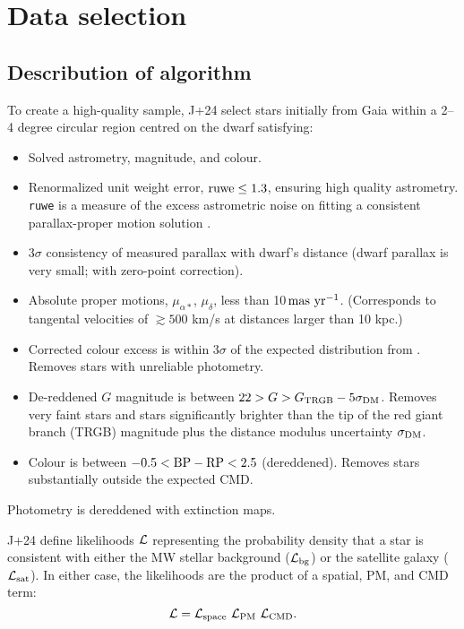 \chapter{Data selection}\label{data-selection}

\section{Describution of algorithm}\label{describution-of-algorithm}

To create a high-quality sample, J+24 select stars initially from Gaia
within a 2--4 degree circular region centred on the dwarf satisfying:

\begin{itemize}
\tightlist
\item
  Solved astrometry, magnitude, and colour.
\item
  Renormalized unit weight error, \({\rm ruwe} \leq 1.3\), ensuring high
  quality astrometry. \texttt{ruwe} is a measure of the excess
  astrometric noise on fitting a consistent parallax-proper motion
  solution \citep[see][]{lindegren+2021}.\\
\item
  3\(\sigma\) consistency of measured parallax with dwarf's distance
  (dwarf parallax is very small; with \citet{lindegren+2021} zero-point
  correction).
\item
  Absolute proper motions, \(\mu_{\alpha*}\), \(\mu_\delta\), less than
  10\(\,{\rm mas\ yr^{-1}}\). (Corresponds to tangental velocities of
  \(\gtrsim 500\) km/s at distances larger than 10 kpc.)
\item
  Corrected colour excess is within 3\(\sigma\) of the expected
  distribution from \citet{riello+2021}. Removes stars with unreliable
  photometry.
\item
  De-reddened \(G\) magnitude is between
  \(22 > G > G_{\rm TRGB} - 5\sigma_{\rm DM}\). Removes very faint stars
  and stars significantly brighter than the tip of the red giant branch
  (TRGB) magnitude plus the distance modulus uncertainty
  \(\sigma_{\rm DM}\).
\item
  Colour is between \(-0.5 < {\rm BP - RP} <  2.5\) (dereddened).
  Removes stars substantially outside the expected CMD.
\end{itemize}

Photometry is dereddened with \citet{schlegel+finkbeiner+davis1998}
extinction maps.

J+24 define likelihoods \({\cal L}\) representing the probability
density that a star is consistent with either the MW stellar background
(\({\cal L}_{\rm bg}\)) or the satellite galaxy
(\({\cal L}_{\rm sat}\)). In either case, the likelihoods are the
product of a spatial, PM, and CMD term: \begin{equation}{
{\cal L} = {\cal L}_{\rm space}\ {\cal L}_{\rm PM}\ {\cal L}_{\rm CMD}.
}\end{equation}

